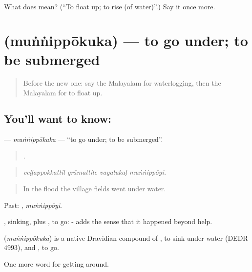 \begin{tcolorbox}[breakable,colback=teal!4,colframe=teal!35!black,title={Before you move on}]
What does  mean? (\textquotedblleft{}To float up; to rise (of water)\textquotedblright{}.) Say it once more.
\end{tcolorbox}
\section[\texorpdfstring{\ml{മുങ്ങിപ്പോകുക} (muṅṅippōkuka)}{മുങ്ങിപ്പോകുക (muṅṅippōkuka)}]{ (muṅṅippōkuka) — to go under; to be submerged}

\label{lesson:ML-C512-munnippokuka}



\begin{quote}
Before the new one: say the Malayalam for waterlogging, then the Malayalam for to float up.
\end{quote}

\subsection*{You'll want to know: }
\textbf{} — \emph{muṅṅippōkuka} — \textquotedblleft{}to go under; to be submerged\textquotedblright{}.

\begin{quote}
   .
\end{quote}

\begin{quote}
\emph{veḷḷappokkattil grāmattile vayalukaḷ muṅṅippōyi.}
\end{quote}

\begin{quote}
In the flood the village fields went under water.
\end{quote}

Past: , \emph{muṅṅippōyi}.

, sinking, plus , to go: - adds the sense that it happened beyond help.

\begin{cousinweb}
\textbf{} (\emph{muṅṅippōkuka}) is a native Dravidian compound of , to sink under water (DEDR 4993), and , to go.
\end{cousinweb}

\begin{grammarlens}[title={What you've built}]
One more word for getting around.
\end{grammarlens}

